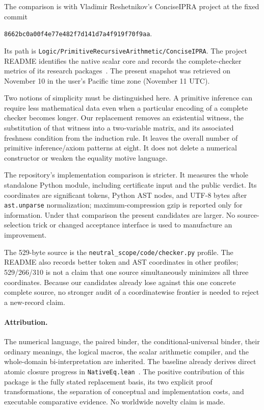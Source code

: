 \documentclass[11pt]{article}
\theoremstyle{definition}
\begin{document}
The comparison is with Vladimir Reshetnikov's ConciseIPRA project at the
fixed commit
\begin{center}\texttt{8662bc0a00f4e77e482f7d141d7a4f919f70f9aa}.\end{center}
Its path is
\texttt{Logic/PrimitiveRecursiveArithmetic/ConciseIPRA}. The project README
identifies the native scalar core and records the complete-checker metrics
of its research packages~\cite{repo}. The present snapshot was retrieved on
November 10 in the user's Pacific time zone (November 11 UTC).

Two notions of simplicity must be distinguished here. A primitive inference
can require less mathematical data even when a particular encoding of a
complete checker becomes longer. Our replacement removes an existential
witness, the substitution of that witness into a two-variable matrix, and
its associated freshness condition from the induction rule. It leaves the
overall number of primitive inference/axiom patterns at eight. It does not
delete a numerical constructor or weaken the equality motive language.

The repository's implementation comparison is stricter. It measures the
whole standalone Python module, including certificate input and the public
verdict. Its coordinates are significant tokens, Python AST nodes, and UTF-8
bytes after \texttt{ast.unparse} normalization; maximum-compression gzip is
reported only for information. Under that comparison the present candidates
are larger. No source-selection trick or changed acceptance interface is used
to manufacture an improvement.

The 529-byte source is the \texttt{neutral\_scope/code/checker.py} profile.
The README also records better token and AST coordinates in other profiles;
529/266/310 is not a claim that one source simultaneously minimizes all three
coordinates. Because our candidates already lose against this one concrete
complete source, no stronger audit of a coordinatewise frontier is needed to
reject a new-record claim.

\paragraph{Attribution.}
The numerical language, the paired binder, the conditional-universal binder,
their ordinary meanings, the logical macros, the scalar arithmetic compiler,
and the whole-domain bi-interpretation are inherited. The baseline already
derives direct atomic closure progress in \texttt{NativeEq.lean}~\cite{nativeeq}. The positive
contribution of this package is the fully stated replacement basis, its
two explicit proof transformations, the separation of conceptual and
implementation costs, and executable comparative evidence. No worldwide
novelty claim is made.
\end{document}
